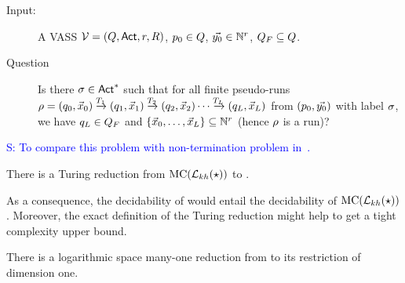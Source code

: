 \documentclass[envcountsame,a4paper,12pt]{llncs}
\begin{document}
\begin{description}
  \item[Input:] A VASS $\mathcal{V} = (Q,{\rm \sf Act},r,R)$,
    $p_0 \in Q$, $\vec{y_0} \in \mathbb{N}^r$, $Q_F \subseteq Q$.  

  \item[Question] Is there $\sigma \in {\rm \sf Act}^*$  such that
    for all finite pseudo-runs
    $\arun =
\pair{\alocation_0}{\vec{x}_0} \step{\atransition_1}
\pair{\alocation_1}{\vec{x}_1} \step{\atransition_2}
\pair{\alocation_2}{\vec{x}_2} \cdots
\step{\atransition_L}
\pair{\alocation_L}{\vec{x}_L}$
from $(p_0,\vec{y_0})$ with label $\sigma$,
we have $q_L \in Q_F$ and $\{ \vec{x}_0,\ldots,\vec{x}_L \}
\subseteq \mathbb{N}^r$ (hence $\rho$ is a run)?
\end{description}

\textcolor{blue}{S: To compare this problem with non-termination problem in~\cite{Perez17}.}

\begin{lemma} \label{lemma-from-mc-to-p}
  There is a Turing reduction from ${\rm MC (}\mathcal{L}_{kh}(\star){\rm )}$ to
  \ourvasspb. 
\end{lemma}

As a consequence, the decidability of  \ourvasspb would entail the decidability of
${\rm MC (}\mathcal{L}_{kh}(\star){\rm )}$. Moreover, the exact definition of the Turing reduction
might help to get a tight complexity upper bound.





\begin{lemma} There is a logarithmic space many-one reduction
 from \ourvasspb to its restriction of dimension one.
\end{lemma}
\end{document}
